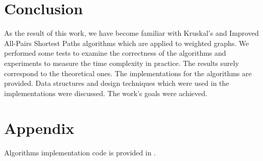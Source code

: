 \documentclass[12pt, bachelor, substylefile = algo_title.rtx]{disser}
\theoremstyle{definition}
\begin{document}
\section*{Conclusion}
As the result of this work, we have become familiar with Kruskal's and Improved All-Pairs Shortest Paths algorithms which are applied to weighted graphs. We performed some tests to examine the correctness of the algorithms and experiments to measure the time complexity in practice. The results surely correspond to the theoretical ones. The implementations for the algorithms are provided. Data structures and design techniques which were used in the implementations were discussed. The work's goals were achieved.

\section*{Appendix}
Algorithms implementation code is provided in \cite{repogithub}.

{\small }

\end{document}
